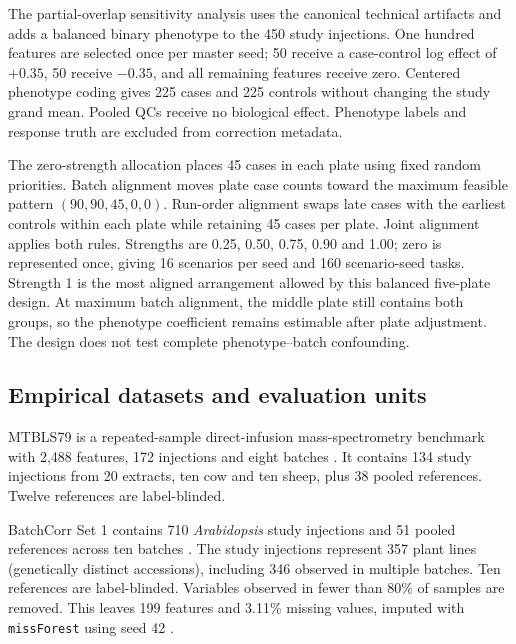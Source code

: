 \documentclass[namedate,webpdf,modern,large,nocrop]{oup-authoring-template}
\begin{document}
The partial-overlap sensitivity analysis uses the canonical technical artifacts and adds a balanced binary phenotype to the 450 study injections. One hundred features are selected once per master seed; 50 receive a case-control log effect of $+0.35$, 50 receive $-0.35$, and all remaining features receive zero. Centered phenotype coding gives 225 cases and 225 controls without changing the study grand mean. Pooled QCs receive no biological effect. Phenotype labels and response truth are excluded from correction metadata.

The zero-strength allocation places 45 cases in each plate using fixed random priorities. Batch alignment moves plate case counts toward the maximum feasible pattern \((90,90,45,0,0)\). Run-order alignment swaps late cases with the earliest controls within each plate while retaining 45 cases per plate. Joint alignment applies both rules. Strengths are 0.25, 0.50, 0.75, 0.90 and 1.00; zero is represented once, giving 16 scenarios per seed and 160 scenario-seed tasks. Strength 1 is the most aligned arrangement allowed by this balanced five-plate design. At maximum batch alignment, the middle plate still contains both groups, so the phenotype coefficient remains estimable after plate adjustment. The design does not test complete phenotype--batch confounding.

\subsection{Empirical datasets and evaluation units}

MTBLS79 is a repeated-sample direct-infusion mass-spectrometry benchmark with 2,488 features, 172 injections and eight batches \citep{Kirwan2014DIMSBenchmark}. It contains 134 study injections from 20 extracts, ten cow and ten sheep, plus 38 pooled references. Twelve references are label-blinded.

BatchCorr Set 1 contains 710 \emph{Arabidopsis} study injections and 51 pooled references across ten batches \citep{Wehrens2016BatchCorr}. The study injections represent 357 plant lines (genetically distinct accessions), including 346 observed in multiple batches. Ten references are label-blinded. Variables observed in fewer than 80\% of samples are removed. This leaves 199 features and 3.11\% missing values, imputed with \texttt{missForest} using seed 42 \citep{Stekhoven2012missForest}.
\end{document}
